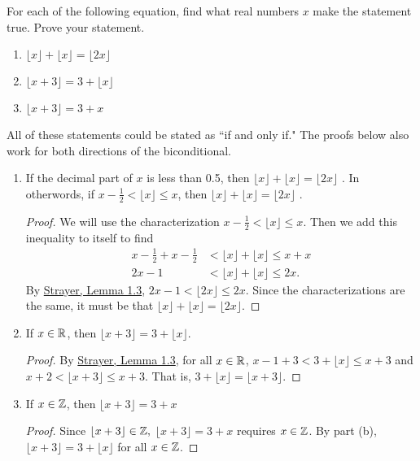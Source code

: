 \documentclass[letterpaper, 11 pt]{../ximera}
\begin{document}
\begin{problem}\label{hw-tf}%
For each of the following equation, find what real numbers \(x\)  make the statement true. Prove your statement.%
    \begin{enumerate}
            \item \( \lfloor x \rfloor + \lfloor x \rfloor =\lfloor 2x\rfloor\)%
            \item \( \lfloor x + 3 \rfloor  = 3 +\lfloor x\rfloor\)%
            \item \( \lfloor x +3 \rfloor = 	3 + x\)%
    \end{enumerate}
%
    \begin{solution}
    All of these statements could be stated as ``if and only if." The proofs below also work for both directions of the biconditional.%
%
    \begin{enumerate}
            \item If the decimal part of \(x\) is less than 0.5, then \(\lfloor x \rfloor + \lfloor x \rfloor =\lfloor 2x\rfloor\) . In otherwords, if \(x-\frac{1}{2} < \lfloor x \rfloor\leq x\), then \(\lfloor x \rfloor + \lfloor x \rfloor =\lfloor 2x\rfloor\) .
            
                \begin{proof}
                We will use the characterization \(x-\frac{1}{2} < \lfloor x \rfloor\leq x\). Then we add this inequality to itself to find%
                    \begin{align*}
                        x-\frac{1}{2}+x-\frac{1}{2} &   
                        < \lfloor x \rfloor +\lfloor x \rfloor\leq x + x\\
                        2x-1 &   
                        < \lfloor x \rfloor +\lfloor x \rfloor\leq 2x. 
                    \end{align*}
                By \hyperref[lem-floor]{Strayer, Lemma 1.3}, \(2x-1 < \lfloor 2x \rfloor \leq 2x.\) Since the characterizations are the same, it must be that \(\lfloor x \rfloor +\lfloor x \rfloor=\lfloor 2x \rfloor .\)%
                \end{proof}
            \item If \(x\in\mathbb R\), then \(\lfloor x + 3 \rfloor  = 3 +\lfloor x\rfloor\). 
            \begin{proof}
                By \hyperref[lem-floor]{Strayer, Lemma 1.3}, for all \(x\in\mathbb R\), \(x-1 +3 < 3 + \lfloor x \rfloor \leq x + 3\) and \(x + 2 < \lfloor x + 3 \rfloor \leq x +3 \). That is, \(3 + \lfloor x \rfloor= \lfloor x +3 \rfloor\).%
            \end{proof}
            \item If \(x\in\mathbb Z\), then \(\lfloor x +3 \rfloor = 	3 + x\)  
            \begin{proof}
                Since \(\lfloor x +3 \rfloor \in \mathbb Z,\) \(\lfloor x +3 \rfloor = 	3 + x\) requires \(x\in\mathbb Z\). By part (b), \(\lfloor x + 3 \rfloor  = 3 +\lfloor x\rfloor\) for all \(x\in\mathbb Z\).%
            \end{proof}
        \end{enumerate}
            

\end{solution}
\end{problem}
\end{document}
